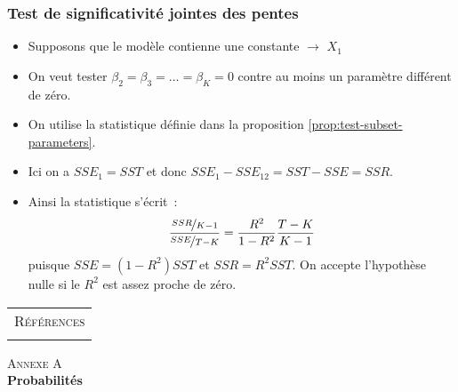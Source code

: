 \documentclass[10pt]{beamer}
\theoremstyle{plain}
\begin{document}
\begin{frame}
  \frametitle{Test de significativité jointes des pentes}

  \begin{itemize}

  \item Supposons que le modèle contienne une constante $\rightarrow$ $X_1$\newline

  \item On veut tester $\beta_2=\beta_3=\dots=\beta_K=0$ contre au moins un paramètre différent de zéro.\newline

  \item On utilise la statistique définie dans la proposition \ref{prop:test-subset-parameters}.\newline

  \item Ici on a $SSE_1 = SST$ et donc $SSE_1-SSE_{12} = SST - SSE = SSR$.\newline

  \item Ainsi la statistique s'écrit~:
    \[
      \frac{\nicefrac{SSR}{K-1}}{\nicefrac{SSE}{T-K}} = \frac{R^2}{1-R^2}\frac{T-K}{K-1}
    \]
    puisque $SSE = (1-R^2)SST$ et $SSR = R^2SST$. On accepte l'hypothèse nulle si le $R^2$ est assez proche de zéro.

  \end{itemize}


\end{frame}


\begin{notes}

  \begin{center}
    \begin{tabular}{c}
      \\
      \Huge{\textsc{Références}}\\
      \\
    \end{tabular}
  \end{center}

  \bigskip

  \nocite{Green2017}

  \nocite{Schmidt1976}

  \printbibliography

\end{notes}



\begin{frame}
  \begin{center}
    \Huge{\textsc{Annexe A}}\\
    \Huge\textbf{Probabilités}
  \end{center}
\end{frame}
\end{document}
